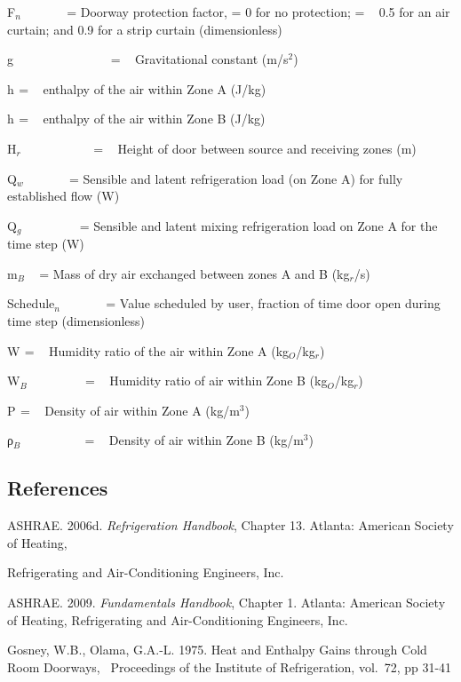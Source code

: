 F\(_{n}\) ~~~~~~ = Doorway protection factor, = 0 for no protection; = ~ 0.5 for an air curtain; and 0.9 for a strip curtain (dimensionless)

g~~~~~~~~~~~~~~~ = ~ Gravitational constant (m/s\(^{2}\))

h\(_{ }\) = ~ enthalpy of the air within Zone A (J/kg)

h\(_{ }\) = ~ enthalpy of the air within Zone B (J/kg)

H\(_{r}\)~~~~~~~~~~~ = ~ Height of door between source and receiving zones (m)

Q\(_{w}\) ~~~~~~ = Sensible and latent refrigeration load (on Zone A) for fully established flow (W)

Q\(_{g}\) ~~~~~~~~ = Sensible and latent mixing refrigeration load on Zone A for the time step (W)

m\(_{B}\) ~ = Mass of dry air exchanged between zones A and B (kg\(_{r}\)/s)

Schedule\(_{n}\) ~~~~~~ = Value scheduled by user, fraction of time door open during time step (dimensionless)

W\(_{ }\) = ~ Humidity ratio of the air within Zone A (kg\(_{O}\)/kg\(_{r}\))

W\(_{B}\) ~~~~~~~~ = ~ Humidity ratio of air within Zone B (kg\(_{O}\)/kg\(_{r}\))

Ρ\(_{ }\) = ~ Density of air within Zone A (kg/m\(^{3}\))

ρ\(_{B}\) ~~~~~~~~~ = ~ Density of air within Zone B (kg/m\(^{3}\))

\subsection{References}\label{references}

ASHRAE. 2006d. \emph{Refrigeration Handbook}, Chapter 13. Atlanta: American Society of Heating,

Refrigerating and Air-Conditioning Engineers, Inc.

ASHRAE. 2009. \emph{Fundamentals Handbook}, Chapter 1. Atlanta: American Society of Heating, Refrigerating and Air-Conditioning Engineers, Inc.

Gosney, W.B., Olama, G.A.-L. 1975. Heat and Enthalpy Gains through Cold Room Doorways,~ Proceedings of the Institute of Refrigeration, vol.~72, pp 31-41
